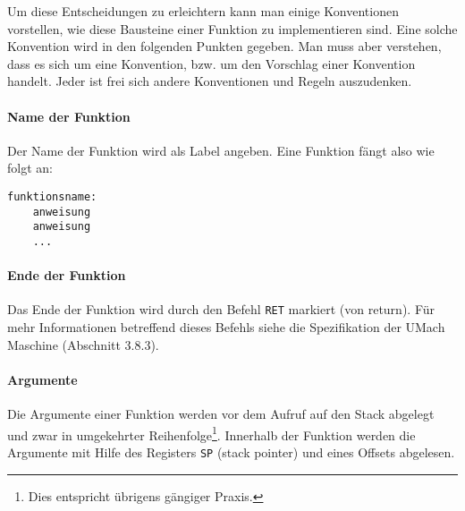 Um diese Entscheidungen zu erleichtern kann man einige Konventionen vorstellen,
wie diese Bausteine einer Funktion zu implementieren sind. Eine solche
Konvention wird in den folgenden Punkten gegeben. Man muss aber verstehen, dass
es sich um eine Konvention, bzw. um den Vorschlag einer Konvention handelt.
Jeder ist frei sich andere Konventionen und Regeln auszudenken.

\paragraph{Name der Funktion}
Der Name der Funktion wird als Label angeben. Eine Funktion fängt also wie folgt
an:
\begin{lstlisting}
funktionsname:
    anweisung
    anweisung
    ...
\end{lstlisting}


\paragraph{Ende der Funktion}
Das Ende der Funktion wird durch den Befehl \texttt{RET} markiert (von
\glqq return\grqq). Für mehr Informationen betreffend dieses Befehls siehe die
Spezifikation der UMach Maschine (Abschnitt 3.8.3).


\paragraph{Argumente}

Die Argumente einer Funktion werden vor dem Aufruf auf den Stack abgelegt und
zwar in umgekehrter Reihenfolge\footnote{Dies entspricht übrigens gängiger
Praxis.}. Innerhalb der Funktion werden die Argumente mit Hilfe des Registers
\texttt{SP} (stack pointer) und eines Offsets abgelesen.

